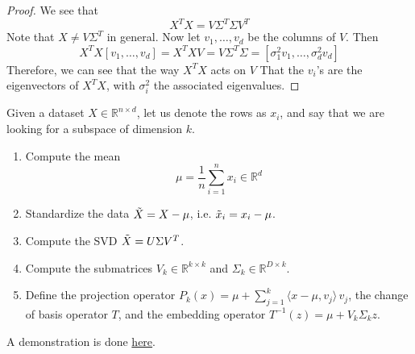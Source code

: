     \begin{proof}
      We see that 
      \begin{equation}
        X^T X =  V \Sigma^T \Sigma V^T
      \end{equation}
      Note that $X \neq V \Sigma^T$ in general. Now let $v_1, \ldots, v_d$ be the columns of $V$. Then 
      \begin{equation}
        X^T X [v_1, \ldots, v_d] = X^T X V = V \Sigma^T \Sigma = [\sigma_1^2 v_1, \ldots, \sigma_d^2 v_d]
      \end{equation}
      Therefore, we can see that the way $X^T X$ acts on $V$ That the $v_i$'s are the eigenvectors of $X^T X$, with $\sigma_i^2$ the associated eigenvalues. 
    \end{proof}

    \begin{algo}[Fitting] 
      Given a dataset $X \in \mathbb{R}^{n \times d}$, let us denote the rows as $x_i$, and say that we are looking for a subspace of dimension $k$. 
      \begin{enumerate}
        \item Compute the mean 
        \begin{equation}
          \mu = \frac{1}{n} \sum_{i=1}^n x_i  \in \mathbb{R}^d
        \end{equation} 

        \item Standardize the data $\Tilde{X} = X - \mu$, i.e. $\Tilde{x}_i = x_i - \mu$.  

        \item Compute the SVD $\Tilde{X} = U \Sigma V^T$.

        \item Compute the submatrices $V_k \in \mathbb{R}^{k \times k}$ and $\Sigma_k \in \mathbb{R}^{D \times k}$. 

        \item Define the projection operator $P_k (x) = \mu + \sum_{j=1}^k \langle x - \mu, v_j \rangle \, v_j$, the change of basis operator $T$, and the embedding operator $T^{-1} (z) = \mu + V_k \Sigma_k z$. 
      \end{enumerate} 
      A demonstration is done \href{code/pca.html}{here}.
    \end{algo}

